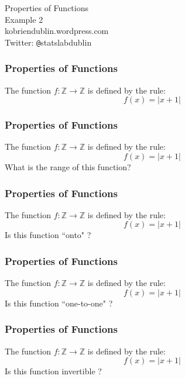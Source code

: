 \documentclass{beamer}
\begin{document}
\begin{frame}
\begin{center}
\Huge
Properties of Functions\\
\LARGE
Example 2\\
\bigskip
kobriendublin.wordpress.com\\
Twitter: \texttt{@}statslabdublin


\end{center}

\end{frame}

\begin{frame}
\frametitle{Properties of Functions}
\huge
\vspace{-1cm}
The function $f : \mathbb{Z} \rightarrow \mathbb{Z}$ is defined by the rule:
\[f(x) = |x + 1 | \]



\end{frame}

\begin{frame}
\frametitle{Properties of Functions}
\Large
\vspace{-2cm}
The function $f : \mathbb{Z} \rightarrow \mathbb{Z}$ is defined by the rule:
\[f(x) = |x + 1| \]
What is the range of this function?


\end{frame}
\begin{frame}
\frametitle{Properties of Functions}
\Large
\vspace{-2cm}
The function $f : \mathbb{Z} \rightarrow \mathbb{Z}$ is defined by the rule:
\[f(x) = |x + 1| \]
Is this function ``onto" ?


\end{frame}
\begin{frame}
\frametitle{Properties of Functions}
\Large
\vspace{-2cm}
The function $f : \mathbb{Z} \rightarrow \mathbb{Z}$ is defined by the rule:
\[f(x) = |x + 1| \]
Is this function ``one-to-one" ?


\end{frame}
\begin{frame}
\frametitle{Properties of Functions}
\Large
\vspace{-2cm}
The function $f : \mathbb{Z} \rightarrow \mathbb{Z}$ is defined by the rule:
\[f(x) = |x + 1| \]
Is this function invertible ?


\end{frame}
\end{document}
